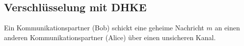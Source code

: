 \documentclass[
  a4paper,
  11pt,
]{scrartcl}
\theoremstyle{plain}
\theoremstyle{definition}
\theoremstyle{remark}
\begin{document}
\subsection{Verschlüsselung mit DHKE}
\label{sub:enc_with_dhke}
Ein Kommunikationspartner (Bob) schickt eine geheime Nachricht $m$ an einen anderen Kommunikationspartner (Alice) über einen unsicheren Kanal.
\end{document}
